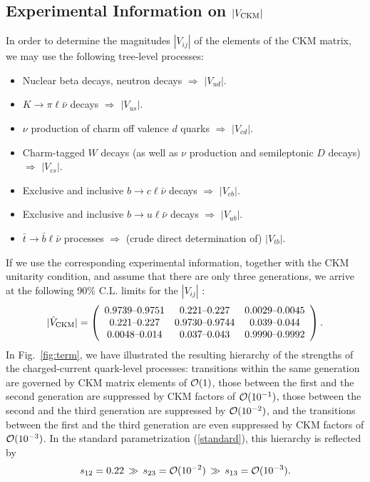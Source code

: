 \documentclass[11pt]{cernrep}
\begin{document}
%
%
%
\boldmath\subsection{Experimental Information on $|V_{\rm CKM}|$}\unboldmath
%
%
%
In order to determine the magnitudes $|V_{ij}|$ of the elements of the
CKM matrix, we may use the following tree-level processes:
\begin{itemize}
\item Nuclear beta decays, neutron decays $\Rightarrow$ $|V_{ud}|$.
\item $K\to\pi\ell\bar\nu$ decays $\Rightarrow$ $|V_{us}|$.
\item $\nu$ production of charm off valence $d$ quarks
$\Rightarrow$ $|V_{cd}|$.
\item Charm-tagged $W$ decays (as well as $\nu$ production and 
semileptonic $D$ decays)  $\Rightarrow$ $|V_{cs}|$.
\item Exclusive and inclusive $b\to c \ell \bar\nu$ decays 
$\Rightarrow$ $|V_{cb}|$.
\item Exclusive and inclusive 
$b\to u \ell \bar \nu$ decays $\Rightarrow$ $|V_{ub}|$.
\item $\bar t\to \bar b \ell \bar\nu$ processes $\Rightarrow$ (crude direct 
determination of) $|V_{tb}|$.
\end{itemize}
If we use the corresponding experimental information, together with the 
CKM unitarity condition, and assume that there are only three generations, 
we arrive at the following 90\% C.L. limits for the $|V_{ij}|$ \cite{PDG}:
\begin{equation}\label{CKM-mag}
|\hat V_{\rm CKM}|=
\left(\begin{array}{ccc}
$0.9739\mbox{--}0.9751$ & $0.221\mbox{--}0.227$ & $0.0029\mbox{--}0.0045$\\ 
$0.221\mbox{--}0.227$ & $0.9730\mbox{--}0.9744$ & $0.039\mbox{--}0.044$\\ 
$0.0048\mbox{--}0.014$ & $0.037\mbox{--}0.043$ & $0.9990\mbox{--}0.9992$\\ 
\end{array}\right).
\end{equation}
In Fig.~\ref{fig:term}, we have illustrated the resulting hierarchy 
of the strengths of the charged-current quark-level processes:
transitions within the same generation are governed by 
CKM matrix elements of ${\cal O}(1)$, those between the first and the second 
generation are suppressed by CKM factors of ${\cal O}(10^{-1})$, those 
between the second and the third generation are suppressed by 
${\cal O}(10^{-2})$, and the transitions between the first and the third 
generation are even suppressed by CKM factors of ${\cal O}(10^{-3})$. 
In the standard parametrization (\ref{standard}), this hierarchy is 
reflected by 
\begin{equation}
s_{12}=0.22 \,\gg\, s_{23}={\cal O}(10^{-2}) \,\gg\, 
s_{13}={\cal O}(10^{-3}). 
\end{equation}
\end{document}
